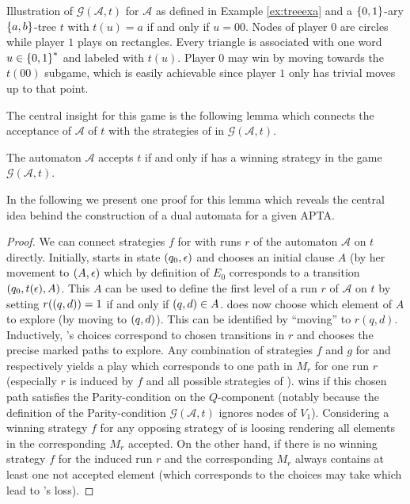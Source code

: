 \begin{drawing}
  \caption{
    Illustration of $\mathcal{G}(\mathcal{A}, t)$ for $\mathcal{A}$ as
    defined in Example \ref{ex:treeexa} and a $\left\{0,1\right\}$-ary $\left\{a,b\right\}$-tree
    $t$ with $t(u) = a$ if and only if $u = 00$. Nodes of player $0$ are 
    circles while player $1$ plays on rectangles. Every triangle is 
    associated with one word $u\in\left\{0,1\right\}^{*}$ and labeled with $t(u)$. 
    Player $0$ may win by moving towards the $t(00)$ subgame, which is easily
    achievable since player $1$ only has trivial moves up to that point.
  }
  \label{fig:treeacceptancegame}
  \begin{center}
  \end{center}
\end{drawing}

The central insight for this game is the following lemma which connects the 
acceptance of $\mathcal{A}$ of $t$ with the strategies of \eve{} in 
$\mathcal{G}(\mathcal{A}, t)$.
\begin{lemma}
  \cite[Lemma 3.1.]{AltTreeAuto}
  The automaton $\mathcal{A}$ accepts $t$ if and only if \eve{} has a 
  winning strategy in the game $\mathcal{G}(\mathcal{A}, t)$.
  \label{lem:stratacceptance}
\end{lemma}
In the following we present one proof for this lemma which reveals the 
central idea behind the construction of a dual automata for a given \ac{APTA}.
\begin{proof}
  We can connect strategies $f$ for \eve{} with runs $r$ of the automaton 
  $\mathcal{A}$ on $t$ directly. Initially, \eve{} starts in state 
  $\left(q_{0}, \epsilon\right)$ and chooses an initial clause $A$ (by her movement
  to $\left(A, \epsilon\right)$ which by definition of $E_{0}$ corresponds to a 
  transition $\left(q_{0}, t(\epsilon), A\right)$. This $A$ can be used to define 
  the first level of a run $r$ of $\mathcal{A}$ on $t$ by setting 
  $r(\left(q,d\right)) = 1$ if and only if $\left(q,d\right)\in A$. \adam{} does now 
  choose which element of $A$ to explore (by moving to $\left(q, d\right)$). This 
  can be identified by \enquote{moving} to $r(q, d)$. Inductively, \eve{}'s 
  choices correspond to chosen transitions in $r$ and \adam{} chooses the 
  precise marked paths to explore. Any combination of strategies $f$ and $g$
  for \eve{} and \adam{} respectively yields a play which corresponds to one 
  path in $M_{r}$ for one run $r$ (especially $r$ is induced by $f$ and all
  possible strategies of \adam{}). \eve{} wins if this chosen path satisfies
  the Parity-condition on the $Q$-component (notably because the definition of
  the Parity-condition $\mathcal{G}(\mathcal{A}, t)$ ignores nodes of $V_{1}$).
  Considering a winning strategy $f$ for \eve{} any opposing strategy of 
  \adam{} is loosing rendering all elements in the corresponding $M_{r}$ 
  accepted. On the other hand, if there is no winning strategy $f$ for \eve{}
  the induced run $r$ and the corresponding $M_{r}$ always contains at least 
  one not accepted element (which corresponds to the choices \adam{} may take 
  which lead to \eve{}'s loss).
\end{proof}

